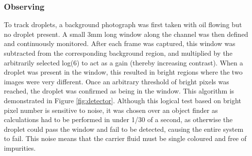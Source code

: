 \documentclass{physics_article_B}
\begin{document}
        \subsubsection{Observing}
        To track droplets, a background photograph was first taken with oil flowing but no droplet present. A small 3mm long window along the channel was then defined and continuously monitored. After each frame was captured, this window was subtracted from the corresponding background region, and multiplied by the arbitrarily selected log(6) to act as a gain (thereby increasing contrast). When a droplet was present in the window, this resulted in bright regions where the two images were very different. Once an arbitrary threshold of bright pixels was reached, the droplet was confirmed as being in the window. This algorithm is demonstrated in Figure \ref{fig:detector}. Although this logical test based on bright pixel number is sensitive to noise, it was chosen over an object finder as calculations had to be performed in under 1/30 of a second, as otherwise the droplet could pass the window and fail to be detected, causing the entire system to fail. This noise means that the carrier fluid must be single coloured and free of impurities. \\
        
\end{document}

